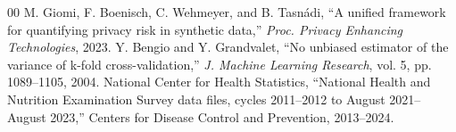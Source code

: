 \documentclass[conference]{IEEEtran}
\begin{document}
\begin{thebibliography}{00}
 M. Giomi, F. Boenisch, C. Wehmeyer, and B. Tasn\'adi, ``A unified framework for quantifying privacy risk in synthetic data,'' \textit{Proc. Privacy Enhancing Technologies}, 2023.
 Y. Bengio and Y. Grandvalet, ``No unbiased estimator of the variance of k-fold cross-validation,'' \textit{J. Machine Learning Research}, vol. 5, pp. 1089--1105, 2004.
 National Center for Health Statistics, ``National Health and Nutrition Examination Survey data files, cycles 2011--2012 to August 2021--August 2023,'' Centers for Disease Control and Prevention, 2013--2024.
\end{thebibliography}
\end{document}
